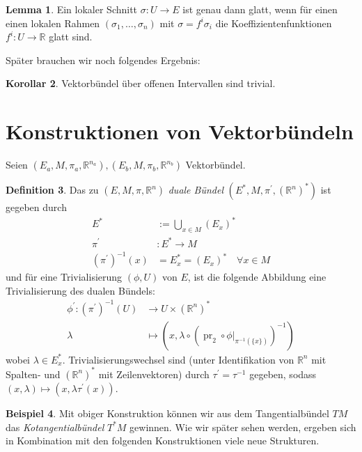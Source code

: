 \documentclass[a4paper]{scrreprt}
\numberwithin{equation}{chapter}
\DeclareMathOperator{\pr}{pr}
\newcommand{\R}{\mathbb{R}}
\theoremstyle{definition}
\newtheorem{defn}{Definition}[section]
\newtheorem{lemma}[defn]{Lemma}
\newtheorem{kor}[defn]{Korollar}
\newtheorem{bsp}[defn]{Beispiel}
\begin{document}
		\begin{lemma}
			Ein lokaler Schnitt $\sigma\colon U\rightarrow E$ ist genau dann glatt, wenn für einen einen lokalen Rahmen $(\sigma_1,\ldots,\sigma_n)$ mit $\sigma=f^i\sigma_i$ die Koeffizientenfunktionen $f^i\colon U\rightarrow \R$ glatt sind. 
		\end{lemma}
		
		Später brauchen wir noch folgendes Ergebnis:
		\begin{kor}\label{kor:Vektorbündel_über_Intervallen}
			Vektorbündel über offenen Intervallen sind trivial.
		\end{kor}
	\section{Konstruktionen von Vektorbündeln}
		Seien $(E_a,M,\pi_a,\R^{n_a}),(E_b,M,\pi_b,\R^{n_b})$ Vektorbündel.\\
		\begin{defn}
			Das zu $(E,M,\pi,\R^{n})$ \emph{duale Bündel} $(E^*,M,\pi^{\prime},(\R^n)^*)$ ist gegeben durch
			\begin{align*}
				E^*&:=\bigcup_{x\in M}(E_{x})^*\\
				\pi^{\prime}&\colon E^*\rightarrow M\\
				(\pi^{\prime})^{-1}(x)&=E^*_x=(E_{x})^*\quad \forall x\in M
			\end{align*}
			und für eine Trivialisierung $(\phi,U)$ von $E$, ist die folgende Abbildung eine Trivialisierung des dualen Bündels:
			\begin{align*}
				\phi^{\prime}\colon(\pi^{\prime})^{-1}(U)&\rightarrow U\times (\R^n)^*\\
				\lambda&\mapsto\left(x,\lambda\circ(\pr_2\circ\phi\vert_{\pi^{-1}(\lbrace x\rbrace)})^{-1}\right)
			\end{align*}
			wobei $\lambda\in E_x^*$. Trivialisierungswechsel sind (unter Identifikation von $\R^n$ mit Spalten- und $(\R^n)^*$ mit Zeilenvektoren) durch $\tau^{\prime}=\tau^{-1}$ gegeben, sodass $(x,\lambda)\mapsto(x,\lambda\tau^{\prime}(x))$.
		\end{defn}
		\begin{bsp}
			Mit obiger Konstruktion können wir aus dem Tangentialbündel $TM$ das \emph{Kotangentialbündel} $T^*M$ gewinnen. Wie wir später sehen werden, ergeben sich in Kombination mit den folgenden Konstruktionen viele neue Strukturen.
		\end{bsp}
\end{document}
